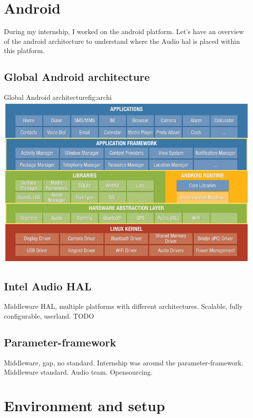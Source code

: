 \section{Android}
During my internship, I worked on the \gls{android} platform.
Let's have an overview of the \gls{android} architecture to understand where
the Audio \gls{hal} is placed within this platform.

\subsection{Global Android architecture}

\begin{figureGraphics}{Global Android architecture}{fig:archi}
\includegraphics[width=\textwidth]{./src/img/android-archi.jpg}
\end{figureGraphics}

\subsection{Intel Audio HAL}
Middleware
HAL, multiple platforms with different architectures.
Scalable, fully configurable, userland.
TODO

\subsection{Parameter-framework}
\label{sec:parameter-framework}
Middleware, gap, no standard.
Internship was around the parameter-framework. Middleware standard. Audio team. Opensourcing.


\section{Environment and setup}


